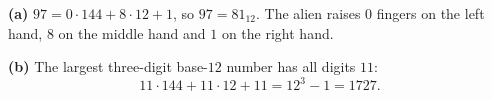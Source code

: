 \textbf{(a)} $97=0\cdot144+8\cdot12+1$, so $97=81_{12}$. The alien raises $0$ fingers on the left hand, $8$ on the middle hand and $1$ on the right hand.

\textbf{(b)} The largest three-digit base-$12$ number has all digits $11$:
\[11\cdot144+11\cdot12+11=12^3-1=\boxed{1727}.\]
